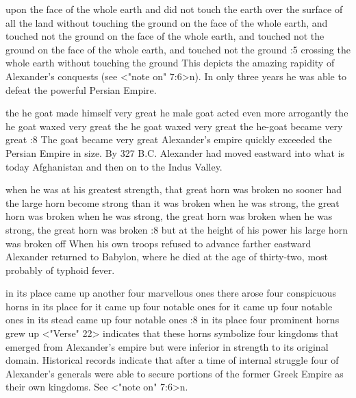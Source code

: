     {upon the face of the whole earth and did not touch the earth} %
    {over the surface of all the land without touching the ground} %
    {on the face of the whole earth, and touched not the ground} %
    {on the face of the whole earth, and touched not the ground} %
    {on the face of the whole earth, and touched not the ground} %
:5 {crossing the whole  earth without touching the ground} This depicts the amazing 
rapidity of Alexander's conquests (see <"note on" 7:6>n). In only three 
years he was able to defeat the powerful Persian Empire.

    {the he goat made himself very great} %
    {he male goat acted even more arrogantly} %
    {the he goat waxed very great} %
    {the he goat waxed very great} %
    {the he-goat became very great} %
:8 {The goat became very great} Alexander's empire quickly 
exceeded the Persian Empire in size. By 327 B.C. Alexander had 
moved eastward into what is today Afghanistan and then on to the 
Indus Valley.


    {when he was at his greatest strength, that great horn was broken} %
    {no sooner had the large horn become strong than it was broken} %
    {when he was strong, the great horn was broken} %
    {when he was strong, the great horn was broken} %
    {when he was strong, the great horn was broken} %
:8 {but at the height of his power his large horn was broken off}
When his own troops refused to advance farther eastward Alexander returned to Babylon,
where he died at the age of thirty-two, most probably of typhoid fever.

    {in its place came up another four marvellous ones} %
    {there arose four conspicuous horns in its place} %
    {for it came up four notable ones} %
    {for it came up four notable ones} %
    {in its stead came up four notable ones} %
:8 {in its place four prominent horns grew up} <"Verse" 22>
indicates that these horns symbolize four kingdoms that 
emerged from Alexander's empire but were inferior in strength to 
its original domain. Historical records indicate that after a time of 
internal struggle four of Alexander's generals were able to secure 
portions of the former Greek Empire as their own kingdoms. See 
<"note on" 7:6>n.

